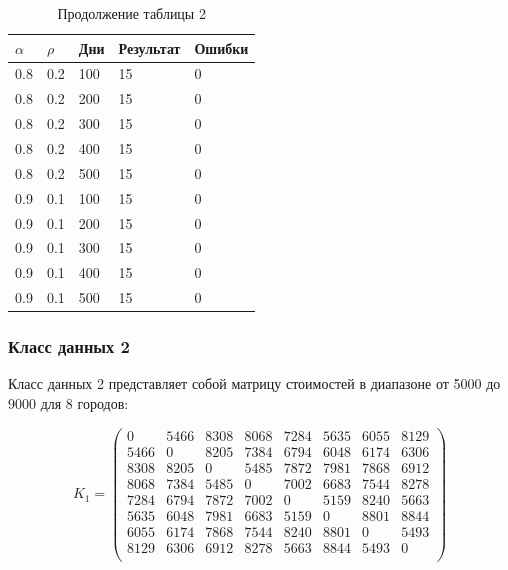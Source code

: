 \begin{center}
	\begin{table}[hbtp]
		\begin{center}
			\begin{flushleft}
				\captionsetup{margin*=125pt}
				\caption*{Продолжение таблицы 2}
			\end{flushleft}
			\begin{tabular}{|l | l | l | l | l | } \hline
				$\alpha$ & $\rho$ & Дни & Результат & Ошибки \\ \hline
		0.8 &  0.2 &  100 &    15 &     0 \\
		0.8 &  0.2 &  200 &    15 &     0 \\
		0.8 &  0.2 &  300 &    15 &     0 \\
		0.8 &  0.2 &  400 &    15 &     0 \\
		0.8 &  0.2 &  500 &    15 &     0 \\
		\hline
		0.9 &  0.1 &  100 &    15 &     0 \\
		0.9 &  0.1 &  200 &    15 &     0 \\
		0.9 &  0.1 &  300 &    15 &     0 \\
		0.9 &  0.1 &  400 &    15 &     0 \\
		0.9 &  0.1 &  500 &    15 &     0 \\
				\hline
			\end{tabular}
		\end{center}
	\end{table}
\end{center}

\pagebreak
\newpage

\subsubsection{Класс данных 2}
Класс данных 2 представляет собой матрицу стоимостей в диапазоне от 5000 до 9000 для 8 городов:

\begin{equation}
	\label{eq:kd2}
	K_{1} = \begin{pmatrix}
		0 & 5466 & 8308 & 8068 & 7284 & 5635 & 6055 & 8129 \\
		5466 & 0 & 8205 & 7384 & 6794 & 6048 & 6174 & 6306 \\
		8308 & 8205 & 0 & 5485 & 7872 & 7981 & 7868 & 6912 \\
		8068 & 7384 & 5485 & 0 & 7002 & 6683 & 7544 & 8278 \\
		7284 & 6794 & 7872 & 7002 & 0 & 5159 & 8240 & 5663 \\
		5635 & 6048 & 7981 & 6683 & 5159 & 0 & 8801 & 8844 \\
		6055 & 6174 & 7868 & 7544 & 8240 & 8801 & 0 & 5493 \\
		8129 & 6306 & 6912 & 8278 & 5663 & 8844 & 5493 & 0 \\
	\end{pmatrix}
\end{equation}

